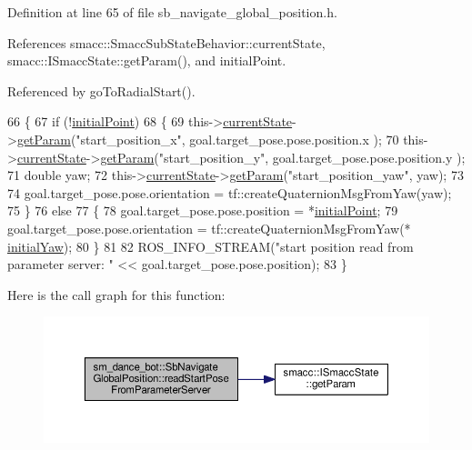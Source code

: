 Definition at line 65 of file sb\+\_\+navigate\+\_\+global\+\_\+position.\+h.



References smacc\+::\+Smacc\+Sub\+State\+Behavior\+::current\+State, smacc\+::\+I\+Smacc\+State\+::get\+Param(), and initial\+Point.



Referenced by go\+To\+Radial\+Start().


\begin{DoxyCode}
66   \{
67     \textcolor{keywordflow}{if} (!\hyperlink{classsm__dance__bot_1_1SbNavigateGlobalPosition_ae4312e56f4859f5a4cd251fd136b3713}{initialPoint})
68     \{
69       this->\hyperlink{classsmacc_1_1SmaccSubStateBehavior_a62e2b9da4a446f09396d0b4c01659b88}{currentState}->\hyperlink{classsmacc_1_1ISmaccState_abbb3a24b912c6e8de28f7b86123b6357}{getParam}(\textcolor{stringliteral}{"start\_position\_x"}, goal.target\_pose.pose.position.x
      );
70       this->\hyperlink{classsmacc_1_1SmaccSubStateBehavior_a62e2b9da4a446f09396d0b4c01659b88}{currentState}->\hyperlink{classsmacc_1_1ISmaccState_abbb3a24b912c6e8de28f7b86123b6357}{getParam}(\textcolor{stringliteral}{"start\_position\_y"}, goal.target\_pose.pose.position.y
      );
71       \textcolor{keywordtype}{double} yaw;
72       this->\hyperlink{classsmacc_1_1SmaccSubStateBehavior_a62e2b9da4a446f09396d0b4c01659b88}{currentState}->\hyperlink{classsmacc_1_1ISmaccState_abbb3a24b912c6e8de28f7b86123b6357}{getParam}(\textcolor{stringliteral}{"start\_position\_yaw"}, yaw);
73 
74       goal.target\_pose.pose.orientation = tf::createQuaternionMsgFromYaw(yaw);
75     \}
76     \textcolor{keywordflow}{else}
77     \{
78       goal.target\_pose.pose.position = *\hyperlink{classsm__dance__bot_1_1SbNavigateGlobalPosition_ae4312e56f4859f5a4cd251fd136b3713}{initialPoint};
79       goal.target\_pose.pose.orientation = tf::createQuaternionMsgFromYaw(*
      \hyperlink{classsm__dance__bot_1_1SbNavigateGlobalPosition_af9096cd0b198b1f9ed2c826ca03949d4}{initialYaw});
80     \}
81 
82     ROS\_INFO\_STREAM(\textcolor{stringliteral}{"start position read from parameter server: "} << goal.target\_pose.pose.position);
83   \}
\end{DoxyCode}


Here is the call graph for this function\+:
\nopagebreak
\begin{figure}[H]
\begin{center}
\leavevmode
\includegraphics[width=350pt]{classsm__dance__bot_1_1SbNavigateGlobalPosition_adc268e278b7de844202959036f424a91_cgraph}
\end{center}
\end{figure}




